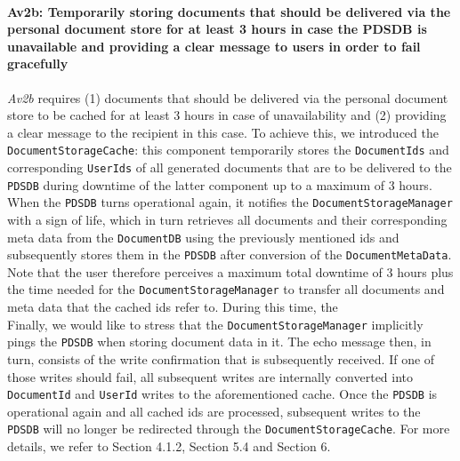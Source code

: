 \documentclass[a4paper,10pt]{article}
\begin{document}
\paragraph{Av2b\@: Temporarily storing documents that should be delivered via the personal document store for at least 3 hours in case the PDSDB is unavailable and providing a clear message to users in order to fail gracefully}
\textit{Av2b} requires (1) documents that should be delivered via the personal document store to be cached for at least 3 hours in case of unavailability and (2) providing a clear message to the recipient in this case. To achieve this, we introduced the \texttt{DocumentStorageCache}: this component temporarily stores the \texttt{DocumentIds} and corresponding \texttt{UserIds} of all generated documents that are to be delivered to the \texttt{PDSDB} during downtime of the latter component up to a maximum of 3 hours.
When the \texttt{PDSDB} turns operational again, it notifies the \texttt{DocumentStorageManager} with a sign of life, which in turn retrieves all documents and their corresponding meta data from the \texttt{DocumentDB} using the previously mentioned ids and subsequently stores them in the \texttt{PDSDB} after conversion of the \texttt{DocumentMetaData}. \\
Note that the user therefore perceives a maximum total downtime of 3 hours plus the time needed for the \texttt{DocumentStorageManager} to transfer all documents and meta data that the cached ids refer to. During this time, the \\
Finally, we would like to stress that the \texttt{DocumentStorageManager} implicitly pings the \texttt{PDSDB} when storing document data in it. The echo message then, in turn, consists of the write confirmation that is subsequently received. If one of those writes should fail, all subsequent writes are internally converted into \texttt{DocumentId} and \texttt{UserId} writes to the aforementioned cache. Once the \texttt{PDSDB} is operational again and all cached ids are processed, subsequent writes to the \texttt{PDSDB} will no longer be redirected through the \texttt{DocumentStorageCache}.
For more details, we refer to Section 4.1.2, Section 5.4 and Section 6.
\end{document}
